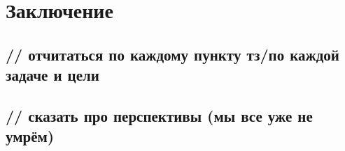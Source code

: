 \chapter{Заключение}
%
\section{// отчитаться по каждому пункту тз/по каждой задаче и цели}

%
\section{// сказать про перспективы (мы все уже не умрём)}

